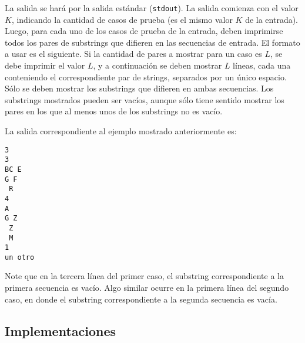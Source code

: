 La salida se hará por la salida estándar (\texttt{stdout}). La salida comienza con el valor $K$, indicando la cantidad de casos de prueba (es el mismo valor $K$ de la entrada). Luego, para cada uno de los casos de prueba de la entrada, deben imprimirse todos los pares de substrings que difieren en las secuencias de entrada. El formato a usar es el siguiente. Si la cantidad de pares a mostrar para un caso es $L$, se debe imprimir el valor $L$, y a continuación se deben mostrar $L$ líneas, cada una conteniendo el correspondiente par de strings, separados por un único espacio. Sólo se deben mostrar los substrings que difieren en ambas secuencias. Los substrings mostrados pueden ser vacíos, aunque sólo tiene sentido mostrar los pares en los que al menos unos de los substrings no es vacío.

La salida correspondiente al ejemplo mostrado anteriormente es:
\begin{verbatim}
3
3
BC E
G F
 R
4
A 
G Z
 Z
 M
1
un otro
\end{verbatim} 
Note que en la tercera línea del primer caso, el substring correspondiente a la primera secuencia es vacío. Algo similar ocurre en la primera línea del segundo caso, en donde el substring correspondiente a la segunda secuencia es vacía.

\subsection{Implementaciones} \label{subsec:implementations}




